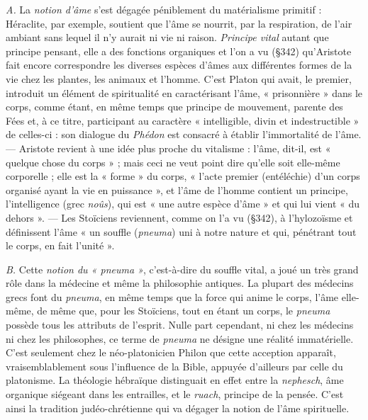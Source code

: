 \vspace{0.24cm}
{\footnotesize 
{\it A.} La \textsf{\textit {notion d'âme}} s’est dégagée péniblement du matérialisme primitif :
Héraclite, par exemple, soutient que l’âme se nourrit, par la respiration,
de l'air ambiant sans lequel il n’y aurait ni vie ni raison. {\it Principe vital}
autant que principe pensant, elle a des fonctions organiques et l'on a vu
(\S 342) qu'Aristote fait encore correspondre les diverses espèces d’âmes
aux différentes formes de la vie chez les plantes, les animaux et l’homme.
C'est Platon qui avait, le premier, introduit un élément de spiritualité
en caractérisant l’âme, « prisonnière » dans le corps, comme étant, en même
temps que principe de mouvement, parente des Fées et, à ce titre, participant
au caractère « intelligible, divin et indestructible » de celles-ci : son
dialogue du {\it Phédon} est consacré à établir l'immortalité de l'âme. — Aristote
revient à une idée plus proche du vitalisme : l'âme, dit-il, est « quelque
chose du corps » ; mais ceci ne veut point dire qu’elle soit elle-même corporelle ;
elle est la « forme » du corps, « l’acte premier (entéléchie) d’un corps
organisé ayant la vie en puissance », et l’âme de l’homme contient un
principe, l'intelligence (grec {\it noûs}), qui est « une autre espèce d'âme » et
qui lui vient « du dehors ». — Les Stoïciens reviennent, comme on l’a vu
(\S 342), à l'hylozoïsme et définissent l’âme « un souffle ({\it pneuma}) uni à
notre nature et qui, pénétrant tout le corps, en fait l'unité ».

{\it B.} Cette \textsf{\textit {notion du « pneuma »}}, c'est-à-dire du souffle vital, a joué un très
grand rôle dans la médecine et même la philosophie antiques. La plupart
des médecins grecs font du {\it pneuma}, en même temps que la force qui anime
le corps, l'âme elle-même, de même que, pour les Stoïciens, tout en étant
un corps, le {\it pneuma} possède tous les attributs de l'esprit. Nulle part cependant,
ni chez les médecins ni chez les philosophes, ce terme de {\it pneuma} ne
désigne une réalité immatérielle. C’est seulement chez le néo-platonicien
Philon que cette acception apparaît, vraisemblablement sous l'influence
de la Bible, appuyée d’ailleurs par celle du platonisme. La théologie
hébraïque distinguait en effet entre la {\it nephesch}, âme organique siégeant
dans les entrailles, et le {\it ruach}, principe de la pensée. C'est ainsi la tradition
judéo-chrétienne qui va dégager la notion de l'âme spirituelle.

}
